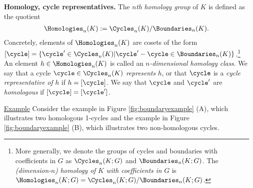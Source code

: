 \noindent \textbf{Homology, cycle representatives.}  The \emph{$n$th homology group} of $K$ is defined as  the quotient
    \begin{align*}
        \Homologies_n(K): = \Cycles_n(K) / \Boundaries_n(K).
    \end{align*}
Concretely, elements of $\Homologies_n(K)$ are cosets of the form $[\cycle] = \{ \cycle'  \in \Cycles_n(K) | \cycle' - \cycle \in \Boundaries_n(K)\}$.\footnote{More generally, we denote the groups of cycles and boundaries with coefficients in $G$ as $\Cycles_n(K; G)$ and $\Boundaries_n(K; G)$.  The \emph{(dimension-$n$) homology of $K$ with coefficients in $G$} is $\Homologies_n(K; G) = \Cycles_n(K; G) / \Boundaries_n(K; G)$.}  An element $h \in \Homologies_n(K)$ is called an \emph{$n$-dimensional homology class}.  We say that a cycle $\cycle \in \Cycles_n(K)$ \emph{represents} $h$, or that $\cycle$ is a \emph{cycle representative of $h$} if $h = [\cycle]$.  We say that $\cycle$ and $\cycle'$ are \emph{homologous} if $[\cycle] = [\cycle']$.

\noindent \underline{Example} Consider the example in Figure \ref{fig:boundaryexample} (A), which illustrates two homologous 1-cycles and the example in Figure \ref{fig:boundaryexample} (B), which illustrates two non-homologous cycles. 

